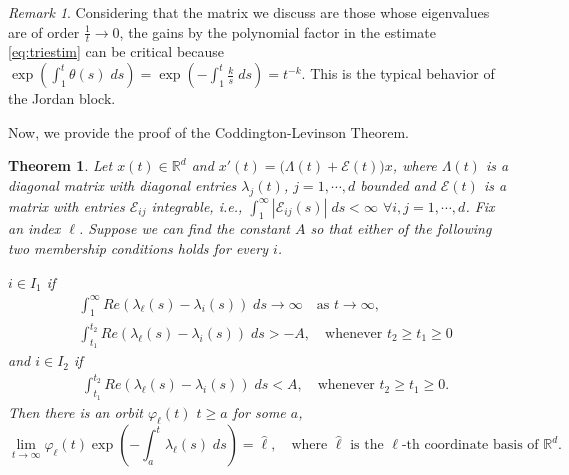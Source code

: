 \documentclass[a4paper,11pt]{article}
\newtheorem{theorem}{Theorem}
\theoremstyle{remark}
\newtheorem{remark}{Remark}[section]
\begin{document}
\begin{remark}
 Considering that the matrix we discuss are those whose eigenvalues are of order $\tfrac{1}{t} \rightarrow 0$, the gains by the polynomial factor in the estimate \eqref{eq:triestim} can be critical because $\exp\left( \int_1^t \theta(s)\;ds\right) =\exp\left( -\int_1^t \frac{k}{s}\;ds\right) =t^{-k}.$ This is the typical behavior of the Jordan block.
\end{remark}
Now, we provide the proof of the Coddington-Levinson Theorem.

\begin{theorem}{\cite[Diagonal Version]{CL1955}}\label{thm:CL} Let $x(t)\in \mathbb{R}^d$ and $x'(t) = \big(\Lambda(t) + \mathcal{E}(t)\big)x$, where $\Lambda(t)$ is a diagonal matrix with diagonal entries $\lambda_j(t)$, $j=1,\cdots,d$ bounded and $\mathcal{E}(t)$ is a matrix with entries $\mathcal{E}_{ij}$ integrable, i.e., $\int_{1}^\infty |\mathcal{E}_{ij}(s)|\; ds < \infty$ $\forall i,j=1,\cdots,d$.
Fix an index $\ell$. Suppose we can find the constant $A$ so that either of the following two membership conditions holds for every $i$.

$i \in I_1$ if
\begin{align}
 &\int_{1}^\infty Re(\lambda_\ell(s) -\lambda_i(s))\; ds \rightarrow \infty \quad \text{as $t \rightarrow \infty$},\label{eq:I1cond1}\\
 &\int_{t_1}^{t_2} Re(\lambda_\ell(s) -\lambda_i(s))\; ds > -A, \quad \text{whenever $t_2\ge t_1\ge 0$} \label{eq:I1cond2}
\end{align}
and $i \in I_2$ if
\begin{align}
 &\int_{t_1}^{t_2} Re(\lambda_\ell(s) -\lambda_i(s))\; ds < A, \quad \text{whenever $t_2\ge t_1\ge 0$}. \label{eq:I2cond}
\end{align}
Then there is an orbit $\varphi_\ell(t)$ $t\ge a$ for some $a$,
\begin{equation}
 \lim_{t \rightarrow \infty} \varphi_\ell(t) \exp\left(-\int_{a}^t \lambda_\ell(s)\; ds\right) = \hat{\ell}, \quad \text{where $\hat{\ell}$ is the $\ell$-th coordinate basis of $\mathbb{R}^d$.}
\end{equation}
\end{theorem}
\end{document}
